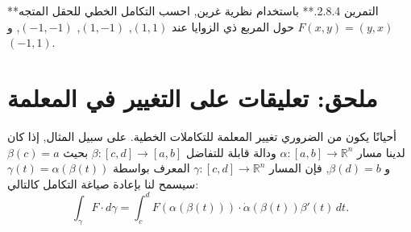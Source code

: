 **التمرين 2.8.4.** باستخدام نظرية غرين, احسب التكامل الخطي للحقل المتجه \(F(x, y) = (y, x)\) حول المربع ذي الزوايا عند \((1, 1)\), \((1, -1)\), \((-1, -1)\), و\((-1, 1)\).



\section{ ملحق: تعليقات على التغيير في المعلمة}

أحيانًا يكون من الضروري تغيير المعلمة للتكاملات الخطية. على سبيل المثال, إذا كان لدينا مسار \(\alpha : [a, b] \to \mathbb{R}^n\) ودالة قابلة للتفاضل \(\beta : [c, d] \to [a, b]\) بحيث \(\beta(c) = a\) و \(\beta(d) = b\), فإن المسار \(\gamma : [c, d] \to \mathbb{R}^n\) المعرف بواسطة \(\gamma(t) = \alpha(\beta(t))\) سيسمح لنا بإعادة صياغة التكامل كالتالي:
\[ \int_\gamma F \cdot d\gamma = \int_c^d F(\alpha(\beta(t))) \cdot \dot{\alpha}(\beta(t)) \beta'(t) \, dt. \]


